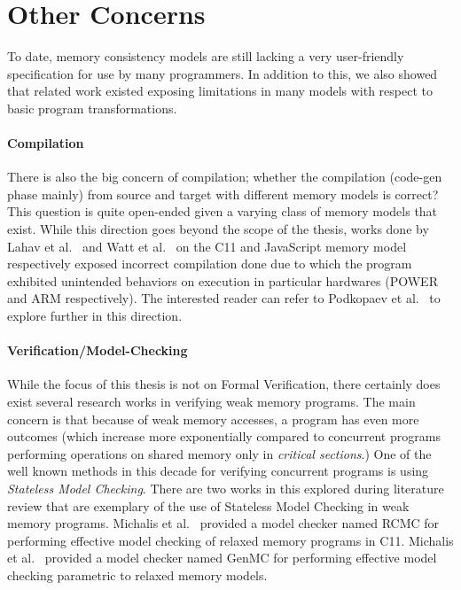 \section{Other Concerns}

    To date, memory consistency models are still lacking a very user-friendly specification for use by many programmers. 
    In addition to this, we also showed that related work existed exposing limitations in many models with respect to basic program transformations.
    
    \paragraph{Compilation}
    There is also the big concern of compilation; whether the compilation (code-gen phase mainly) from source and target with different memory models is correct? 
    This question is quite open-ended given a varying class of memory models that exist. 
    While this direction goes beyond the scope of the thesis, works done by Lahav et al.~\cite{Lahav} and Watt et al.~\cite{WattC} on the C11 and JavaScript memory model respectively exposed incorrect compilation done due to which the program exhibited unintended behaviors on execution in particular hardwares (POWER and ARM respectively). 
    The interested reader can refer to Podkopaev et al.~\cite{Anton} to explore further in this direction.
    
    \paragraph{Verification/Model-Checking}
    While the focus of this thesis is not on Formal Verification, there certainly does exist several research works in verifying weak memory programs. 
    The main concern is that because of weak memory accesses, a program has even more outcomes (which increase more exponentially compared to concurrent programs performing operations on shared memory only in \textit{critical sections}.) 
    One of the well known methods in this decade for verifying concurrent programs is using \textit{Stateless Model Checking}. 
    There are two works in this explored during literature review that are exemplary of the use of Stateless Model Checking in weak memory programs.
    Michalis et al.~\cite{Michalis1} provided a model checker named RCMC for performing effective model checking of relaxed memory programs in C11. 
    Michalis et al.~\cite{Michalis2} provided a model checker named GenMC for performing effective model checking parametric to relaxed memory models. 
    
